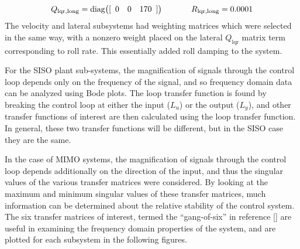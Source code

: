\documentclass[]{../sty/aiaa-tc}
\begin{document}
  \begin{equation*}
    Q_{\text{lqr,long}}=
    \text{diag}\bigr([
    \begin{array}{ccc}
      0 & 0 & 170
    \end{array}]\bigr)
    \hspace{0.5in}
    R_{\text{lqr,long}}=0.0001
  \end{equation*}
  The velocity and lateral subsystems had weighting matrices which were selected in the same way, with a nonzero weight placed on the lateral $Q_{\text{lqr}}$ matrix term corresponding to roll rate.
  This essentially added roll damping to the system.

  For the SISO plant sub-systems, the magnification of signals through the control loop depends only on the frequency of the signal, and so frequency domain data can be analyzed using Bode plots.
  The loop transfer function is found by breaking the control loop at either the input ($L_{u}$) or the output ($L_{y}$), and other transfer functions of interest are then calculated using the loop transfer function.
  In general, these two transfer functions will be different, but in the SISO case they are the same.

  In the case of MIMO systems, the magnification of signals through the control loop depends additionally on the direction of the input, and thus the singular values of the various transfer matrices were considered.
  By looking at the maximum and minimum singular values of these transfer matrices, much information can be determined about the relative stability of the control system.
  The six transfer matrices of interest, termed the ``gang-of-six'' in reference [] are useful in examining the frequency domain properties of the system, and are plotted for each subsystem in the following figures.
\end{document}
